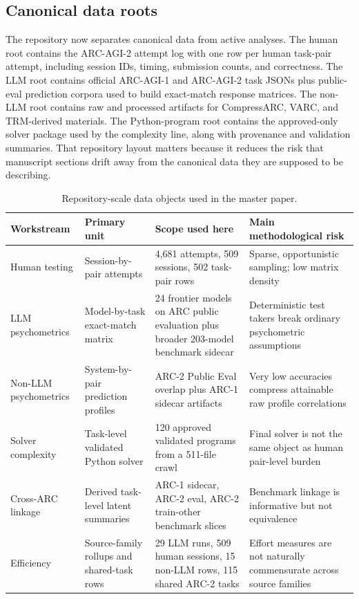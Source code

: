 \documentclass[11pt,letterpaper]{article}
\begin{document}
\subsection{Canonical data roots}

The repository now separates canonical data from active analyses. The human root contains the ARC-AGI-2 attempt log with one row per human task-pair attempt, including session IDs, timing, submission counts, and correctness. The LLM root contains official ARC-AGI-1 and ARC-AGI-2 task JSONs plus public-eval prediction corpora used to build exact-match response matrices. The non-LLM root contains raw and processed artifacts for CompressARC, VARC, and TRM-derived materials. The Python-program root contains the approved-only solver package used by the complexity line, along with provenance and validation summaries. That repository layout matters because it reduces the risk that manuscript sections drift away from the canonical data they are supposed to be describing.

\begin{table}[t]
\centering
\small
\caption{Repository-scale data objects used in the master paper.}
\begin{tabular}{p{1.2in}p{1.3in}p{1.5in}p{2.1in}}
\toprule
\textbf{Workstream} & \textbf{Primary unit} & \textbf{Scope used here} & \textbf{Main methodological risk} \\
\midrule
Human testing & Session-by-pair attempts & 4,681 attempts, 509 sessions, 502 task-pair rows & Sparse, opportunistic sampling; low matrix density \\
LLM psychometrics & Model-by-task exact-match matrix & 24 frontier models on ARC public evaluation plus broader 203-model benchmark sidecar & Deterministic test takers break ordinary psychometric assumptions \\
Non-LLM psychometrics & System-by-pair prediction profiles & ARC-2 Public Eval overlap plus ARC-1 sidecar artifacts & Very low accuracies compress attainable raw profile correlations \\
Solver complexity & Task-level validated Python solver & 120 approved validated programs from a 511-file crawl & Final solver is not the same object as human pair-level burden \\
Cross-ARC linkage & Derived task-level latent summaries & ARC-1 sidecar, ARC-2 eval, ARC-2 train-other benchmark slices & Benchmark linkage is informative but not equivalence \\
Efficiency & Source-family rollups and shared-task rows & 29 LLM runs, 509 human sessions, 15 non-LLM rows, 115 shared ARC-2 tasks & Effort measures are not naturally commensurate across source families \\
\bottomrule
\end{tabular}
\end{table}
\end{document}
